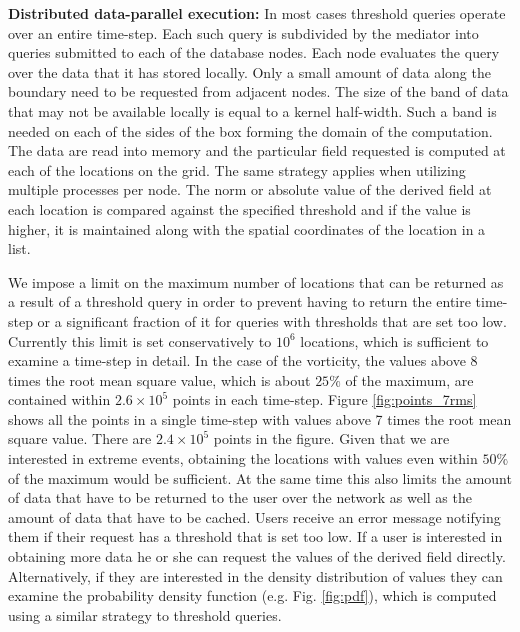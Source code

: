 \documentclass{sig-alternate}
\begin{document}
{\bf Distributed data-parallel execution:} In most cases threshold queries operate over an entire time-step. Each such query is subdivided by 
the mediator into queries submitted to
each of the database nodes. Each node evaluates the query over the data that it has stored locally. Only a small amount of data along the boundary
need to be requested from adjacent nodes. The size of the band of data that may not be available locally is equal to a kernel half-width. 
Such a band is needed on each of the sides of the box forming the domain of the computation.  
The data are read into memory and the particular field requested is computed at each of the locations on
the grid. The same strategy applies when utilizing multiple processes per node. The norm or absolute value of the derived field at each location is compared 
against the specified threshold and if the value is higher, it is maintained along with
the spatial coordinates of the location in a list.

We impose a limit on the maximum number of locations that can be returned as a result of a threshold query in order to prevent having to return
the entire time-step or a significant fraction of it for queries with thresholds that are set too low. Currently this limit is set conservatively to $10^6$ locations, 
which is sufficient to examine a time-step in detail. In the case of the vorticity, the values above 8 times the root mean square value, 
which is about $25\%$ of the maximum, are contained within $2.6\times10^5$ points in each time-step. Figure \ref{fig:points_7rms} shows all the points 
in a single time-step with values above 7 times the root mean square value. There are $2.4\times10^5$ points in the figure.
Given that we are interested in extreme events, obtaining the locations with values even within $50\%$ of the maximum would be sufficient. 
At the same time this also limits the amount of data that have to be returned to the user over the network as well as the amount of
data that have to be cached. Users receive an error message notifying them if their request has a threshold that is set too low. If a user
is interested in obtaining more data he or she can request the values of the derived field directly. Alternatively, if they are interested in the density distribution
of values they can examine the probability density function (e.g. Fig. \ref{fig:pdf}), which is computed using a similar strategy to threshold queries.
\end{document}

